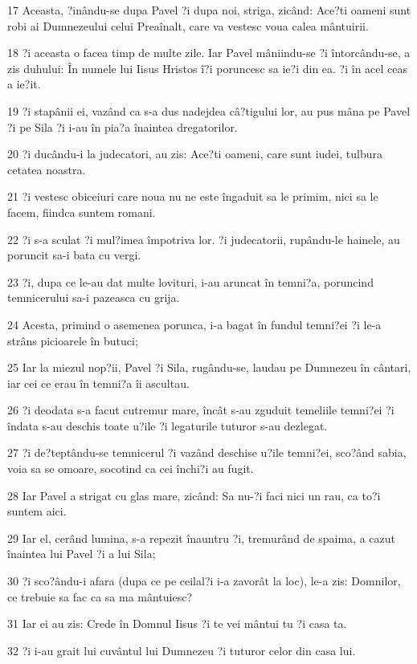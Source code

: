 \par 17 Aceasta, ?inându-se dupa Pavel ?i dupa noi, striga, zicând: Ace?ti oameni sunt robi ai Dumnezeului celui Preaînalt, care va vestesc voua calea mântuirii.
\par 18 ?i aceasta o facea timp de multe zile. Iar Pavel mâniindu-se ?i întorcându-se, a zis duhului: În numele lui Iisus Hristos î?i poruncesc sa ie?i din ea. ?i în acel ceas a ie?it.
\par 19 ?i stapânii ei, vazând ca s-a dus nadejdea câ?tigului lor, au pus mâna pe Pavel ?i pe Sila ?i i-au în pia?a înaintea dregatorilor.
\par 20 ?i ducându-i la judecatori, au zis: Ace?ti oameni, care sunt iudei, tulbura cetatea noastra.
\par 21 ?i vestesc obiceiuri care noua nu ne este îngaduit sa le primim, nici sa le facem, fiindca suntem romani.
\par 22 ?i s-a sculat ?i mul?imea împotriva lor. ?i judecatorii, rupându-le hainele, au poruncit sa-i bata cu vergi.
\par 23 ?i, dupa ce le-au dat multe lovituri, i-au aruncat în temni?a, poruncind temnicerului sa-i pazeasca cu grija.
\par 24 Acesta, primind o asemenea porunca, i-a bagat în fundul temni?ei ?i le-a strâns picioarele în butuci;
\par 25 Iar la miezul nop?ii, Pavel ?i Sila, rugându-se, laudau pe Dumnezeu în cântari, iar cei ce erau în temni?a îi ascultau.
\par 26 ?i deodata s-a facut cutremur mare, încât s-au zguduit temeliile temni?ei ?i îndata s-au deschis toate u?ile ?i legaturile tuturor s-au dezlegat.
\par 27 ?i de?teptându-se temnicerul ?i vazând deschise u?ile temni?ei, sco?ând sabia, voia sa se omoare, socotind ca cei închi?i au fugit.
\par 28 Iar Pavel a strigat cu glas mare, zicând: Sa nu-?i faci nici un rau, ca to?i suntem aici.
\par 29 Iar el, cerând lumina, s-a repezit înauntru ?i, tremurând de spaima, a cazut înaintea lui Pavel ?i a lui Sila;
\par 30 ?i sco?ându-i afara (dupa ce pe ceilal?i i-a zavorât la loc), le-a zis: Domnilor, ce trebuie sa fac ca sa ma mântuiesc?
\par 31 Iar ei au zis: Crede în Domnul Iisus ?i te vei mântui tu ?i casa ta.
\par 32 ?i i-au grait lui cuvântul lui Dumnezeu ?i tuturor celor din casa lui.
